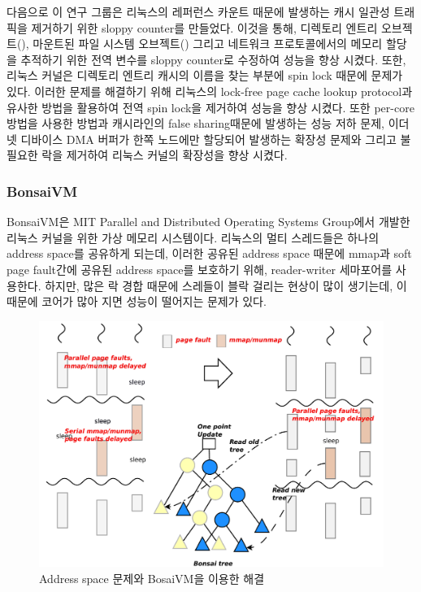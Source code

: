 다음으로 이 연구 그룹은 리눅스의 레퍼런스 카운트 때문에 발생하는 캐시 일관성 트래픽을 제거하기 위한 
sloppy counter를 만들었다. 
이것을 통해, 디렉토리 엔트리 오브젝트(), 마운트된 파일 시스템 오브젝트() 그리고 
네트워크 프로토콜에서의 메모리 할당을 추적하기 위한 전역 변수를 sloppy counter로 수정하여 성능을 향상 시켰다. 
또한, 리눅스 커널은 디렉토리 엔트리 캐시의 이름을 찾는 부분에  spin lock 때문에 문제가 있다. 
이러한 문제를 해결하기 위해 리눅스의 lock-free page cache lookup protocol과 유사한 방법을 활용하여 전역 spin
lock을 제거하여 성능을 향상 시켰다. 
또한 per-core 방법을 사용한 방법과 캐시라인의 false sharing때문에 발생하는 성능 저하 문제, 이더넷 디바이스 
DMA 버퍼가 한쪽 노드에만 할당되어 발생하는 확장성 문제와 그리고 불필요한 락을 제거하여 리눅스 커널의 확장성을 
향상 시켰다.  
\subsubsection{BonsaiVM}

BonsaiVM은 MIT Parallel and Distributed Operating Systems Group에서 개발한 리눅스 커널을 위한 
가상 메모리 시스템이다. 
리눅스의 멀티 스레드들은 하나의 address space를 공유하게 되는데, 이러한 공유된 address space 때문에 
mmap과 soft page fault간에 공유된 address space를 보호하기 위해, reader-writer 세마포어를 사용한다. 
하지만, 많은 락 경합 때문에 스레들이 블락 걸리는 현상이 많이 생기는데, 이 때문에 코어가 많아 지면 성능이 떨어지는 
문제가 있다.

\begin{figure}[h!]
    \centering
    \includegraphics[width=1\textwidth]{fig/bosaivm/bosaivm}
    \caption{Address space 문제와 BosaiVM을 이용한 해결}
  \label{fig:bonsaivm}
\end{figure}


